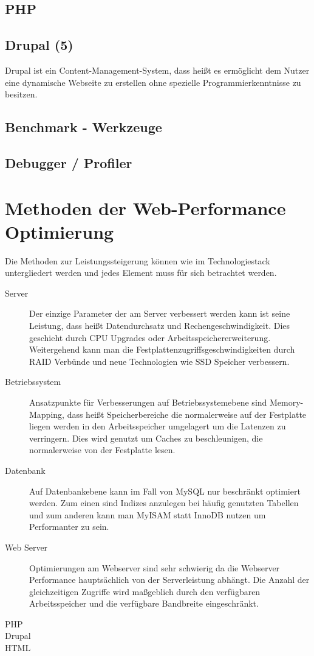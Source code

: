 \subsection{PHP}
\subsection{Drupal (5)}
Drupal ist ein Content-Management-System, dass heißt es ermöglicht dem Nutzer eine dynamische Webseite zu erstellen ohne spezielle Programmierkenntnisse zu besitzen. 
\subsection{Benchmark - Werkzeuge}
\subsection{Debugger / Profiler}
\section{Methoden der Web-Performance Optimierung}
Die Methoden zur Leistungssteigerung können wie im Technologiestack untergliedert werden und jedes Element muss für sich betrachtet werden.

\begin{description}
  \item[Server] Der einzige Parameter der am Server verbessert werden kann ist seine Leistung, dass heißt Datendurchsatz und Rechengeschwindigkeit. Dies geschieht durch CPU Upgrades oder Arbeitsspeichererweiterung. Weitergehend kann man die Festplattenzugriffsgeschwindigkeiten durch RAID Verbünde und neue Technologien wie SSD Speicher verbessern. 
  \item[Betriebssystem] Ansatzpunkte für Verbesserungen auf Betriebssystemebene sind Memory-Mapping, dass heißt Speicherbereiche die normalerweise auf der Festplatte liegen werden in den Arbeitsspeicher umgelagert um die Latenzen zu verringern. Dies wird genutzt um Caches zu beschleunigen, die normalerweise von der Festplatte lesen.
  \item[Datenbank] Auf Datenbankebene kann im Fall von MySQL nur beschränkt optimiert werden. Zum einen sind Indizes anzulegen bei häufig genutzten Tabellen und zum anderen kann man MyISAM statt InnoDB nutzen um Performanter zu sein.
  \item[Web Server] Optimierungen am Webserver sind sehr schwierig da die Webserver Performance hauptsächlich von der Serverleistung abhängt. Die Anzahl der gleichzeitigen Zugriffe wird maßgeblich durch den verfügbaren Arbeitsspeicher und die verfügbare Bandbreite eingeschränkt.
  \item[PHP] 
  \item[Drupal] 
  \item[HTML] 
\end{description}


%
%



